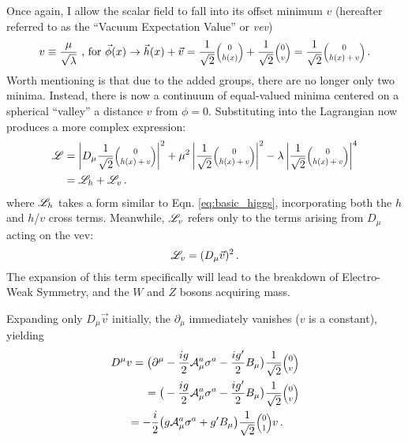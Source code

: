     Once again, I allow the scalar field to fall into its offset minimum $v$
        (hereafter referred to as the ``Vacuum Expectation Value'' or \textit{vev})
    \begin{equation}
        v \equiv \frac{\mu}{\sqrt{\lambda}} \textrm{ ,  for   }
            \vec{\phi}(x) \to \vec{h}(x) + \vec{v} = 
            \frac{1}{\sqrt{2}}\minimatrix{0\\h(x)} + \frac{1}{\sqrt{2}}\minimatrix{0\\v} = \frac{1}{\sqrt{2}}\minimatrix{0\\h(x)+v}
        \,.
    \end{equation}
    Worth mentioning is that due to the added groups, there are no longer only two minima.
    Instead, there is now a continuum of equal-valued minima centered on a spherical ``valley'' a distance $v$ from $\phi=0$.
    Substituting into the Lagrangian now produces a more complex expression:
    \begin{equation} \begin{split}
        \label{eq:fullHiggs}
        \Lag & = \left|D_{\mu} \frac{1}{\sqrt{2}}\minimatrix{0\\h(x)+v}\right|^2
            + \mu^2 \left|\frac{1}{\sqrt{2}}\minimatrix{0\\h(x)+v}\right|^2
            - \lambda \left|\frac{1}{\sqrt{2}}\minimatrix{0\\h(x)+v}\right|^4 \\
         & = \Lag_h + \Lag_v
        \,.
    \end{split} \end{equation}
    where $\mathscr{L}_h$ takes a form similar to Eqn. \ref{eq:basic_higgs}, incorporating both the $h$ and $h$/$v$ cross terms.
    Meanwhile, $\mathscr{L}_v$ refers only to the terms arising from $D_{\mu}$ acting on the vev:
    \begin{equation}
        \label{eq:lagv}
        \mathscr{L}_v = (D_{\mu} \vec{v})^2
        \,.
    \end{equation}
    The expansion of this term specifically will lead to the breakdown of Electro-Weak Symmetry,
        and the $W$ and $Z$ bosons acquiring mass.

    Expanding only $D_{\mu} \vec{v}$ initially, the $\partial_{\mu}$ immediately vanishes ($v$ is a constant), yielding 
    \begin{equation} \begin{split}
        D^{\mu} v  = \big( \partial^{\mu} & - \frac{ig}{2} \wField^a_{\mu} \sigma^a - \frac{ig'}{2} B_{\mu} \big) \frac{1}{\sqrt{2}}\minimatrix{0\\v} \\
        = \big( & - \frac{ig}{2} \wField^a_{\mu} \sigma^a - \frac{ig'}{2} B_{\mu} \big) \frac{1}{\sqrt{2}}\minimatrix{0\\v} \\
        = - \frac{i}{2} \big( & g \wField^a_{\mu} \sigma^a + g' B_{\mu} \big) \frac{1}{\sqrt{2}}\minimatrix{0\\1} v
        \,.
    \end{split} \end{equation}

